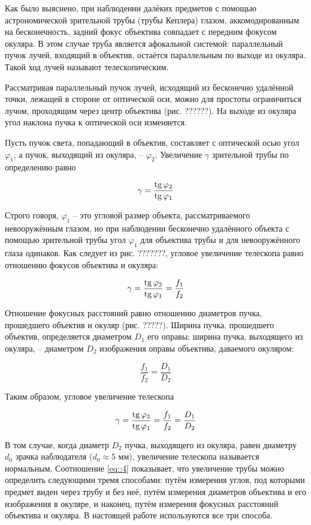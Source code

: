 Как было выяснено, при наблюдении далёких предметов с помощью астрономической
зрительной трубы (трубы Кеплера) глазом, аккомодированным на бесконечность, задний фокус 
объектива совпадает с передним фокусом окуляра. В этом случае труба является афокальной 
системой: параллельный пучок лучей, входящий в объектив, остаётся параллельным по выходе
из окуляра. Такой ход лучей называют телескопическим.

Рассматривая параллельный пучок лучей, исходящий из бесконечно удалённой точки, лежащей 
в стороне от оптической оси, можно для простоты ограничиться лучом, проходящим через 
центр объектива (рис. ??????). На выходе из окуляра угол наклона пучка к оптической 
оси изменяется.

Пусть пучок света, попадающий в объектив, составляет с оптической осью угол $\varphi_1$, 
а пучок, выходящий из окуляра, -- $\varphi_2$. Увеличение $\gamma$ зрительной трубы по 
определению равно

\begin{equation}\label{eq::1}
  \gamma = \frac{\mathop{\mathrm{tg}}\nolimits \varphi_2}{\mathop{\mathrm{tg}}\nolimits \varphi_1}
\end{equation}

Строго говоря, $\varphi_1$ -- это угловой размер объекта, рассматриваемого невооружённым 
глазом, но при наблюдении бесконечно удалённого объекта с помощью зрительной трубы угол
$\varphi_1$ для объектива трубы и для невооружённого глаза одинаков. Как следует из 
рис. ???????, угловое увеличение телескопа равно отношению фокусов объектива и окуляра:

\begin{equation}\label{eq::2}
  \gamma = \frac{\mathop{\mathrm{tg}}\nolimits \varphi_2}{\mathop{\mathrm{tg}}\nolimits \varphi_1} = \frac{f_1}{f_2}
\end{equation}

Отношение фокусных расстояний равно отношению диаметров пучка, прошедшего объектив и 
окуляр (рис. ?????). Ширина пучка, прошедшего объектив, определяется диаметром $D_1$ 
его оправы; ширина пучка, выходящего из окуляра, -- диаметром $D_2$ изображения оправы
объектива, даваемого окуляром:

\begin{equation}\label{eq::3}
  \frac{f_1}{f_2} = \frac{D_1}{D_2}
\end{equation}

Таким образом, угловое увеличение телескопа

\begin{equation}\label{eq::4}
  \gamma = \frac{\mathop{\mathrm{tg}}\nolimits \varphi_2}{\mathop{\mathrm{tg}}\nolimits \varphi_1} = \frac{f_1}{f_2}  = \frac{D_1}{D_2}
\end{equation}

В том случае, когда диаметр $D_2$ пучка, выходящего из окуляра, равен диаметру $d_0$ 
зрачка наблюдателя ($d_0 \approx 5$ мм), увеличение телескопа называется нормальным.
Соотношение \eqref{eq::4} показывает, что увеличение трубы можно определить следующими 
тремя способами: путём измерения углов, под которыми предмет виден через трубу и без неё, 
путём измерения диаметров объектива и его изображения в окуляре, и наконец, путём 
измерения фокусных расстояний объектива и окуляра. В настоящей работе используются
все три способа.
